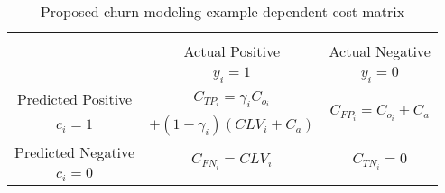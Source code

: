   \begin{table}[htbp]
	  \centering
	  \footnotesize
     \begin{tabular}{c|c|c}
        \multicolumn{3}{c}{}\\
			\multicolumn{1}{c|}{}  & Actual Positive& Actual Negative \\
			\multicolumn{1}{c|}{} & $y_i=1$& $y_i=0$ \\
			\hline
			Predicted Positive 		& $C_{TP_i}=\gamma_iC_{o_i}$ & 
\multirow{2}{*}{$C_{FP_i}=C_{o_i}+C_a$}\\
			$c_i=1$ & $+(1-\gamma_i)(CLV_i+C_a)$ &\\
			\hline
			Predicted Negative  	& \multirow{ 2}{*}{$C_{FN_i}=CLV_i$} & \multirow{ 
			2}{*}{$C_{TN_i}=0$} \\
			$c_i=0$ & &\\
		\end{tabular}
		\caption{Proposed churn modeling example-dependent cost matrix}
    \label{tab:ch5:1}
  \end{table}

